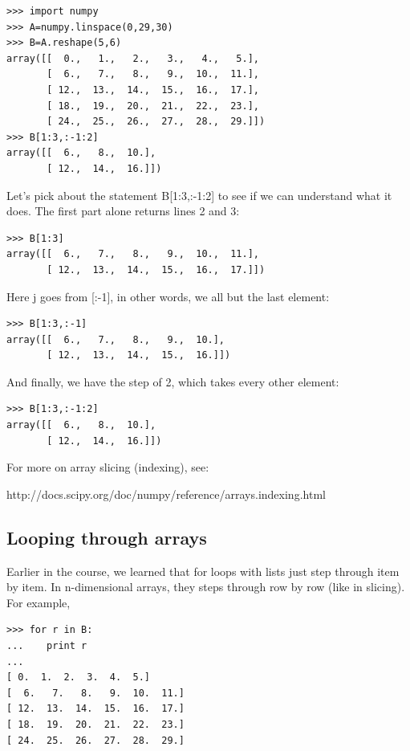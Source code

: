 \documentclass[11pt]{book}
\begin{document}
{{ \color{blue} \begin{verbatim}
>>> import numpy
>>> A=numpy.linspace(0,29,30)
>>> B=A.reshape(5,6)
array([[  0.,   1.,   2.,   3.,   4.,   5.],
       [  6.,   7.,   8.,   9.,  10.,  11.],
       [ 12.,  13.,  14.,  15.,  16.,  17.],
       [ 18.,  19.,  20.,  21.,  22.,  23.],
       [ 24.,  25.,  26.,  27.,  28.,  29.]])
>>> B[1:3,:-1:2] 
array([[  6.,   8.,  10.],
       [ 12.,  14.,  16.]])
\end{verbatim}}

Let's pick about the statement {\color{blue}B[1:3,:-1:2]} to see if we can understand what it does.  The first part alone returns lines 2 and 3:
{ \color{blue} \begin{verbatim}
>>> B[1:3]
array([[  6.,   7.,   8.,   9.,  10.,  11.],
       [ 12.,  13.,  14.,  15.,  16.,  17.]])
\end{verbatim}}

Here  {\color{blue}j} goes from [:-1], in other words, we all but the last element:

{ \color{blue} \begin{verbatim}
>>> B[1:3,:-1]
array([[  6.,   7.,   8.,   9.,  10.],
       [ 12.,  13.,  14.,  15.,  16.]])
\end{verbatim}}

\noindent And finally, we have the step of 2, which takes every other element:

{ \color{blue} \begin{verbatim}
>>> B[1:3,:-1:2] 
array([[  6.,   8.,  10.],
       [ 12.,  14.,  16.]])
\end{verbatim}}

\noindent For more on array slicing (indexing), see:

http://docs.scipy.org/doc/numpy/reference/arrays.indexing.html




\subsection{Looping through arrays}

 Earlier in the course, we learned that  {\color{blue} for} loops with lists  just step through item by item.  In n-dimensional arrays, they steps through row by row (like in slicing).  For example, 
 

{ \color{blue} \begin{verbatim}
>>> for r in B:
...    print r
... 
[ 0.  1.  2.  3.  4.  5.]
[  6.   7.   8.   9.  10.  11.]
[ 12.  13.  14.  15.  16.  17.]
[ 18.  19.  20.  21.  22.  23.]
[ 24.  25.  26.  27.  28.  29.]
\end{verbatim}}

}
\end{document}
